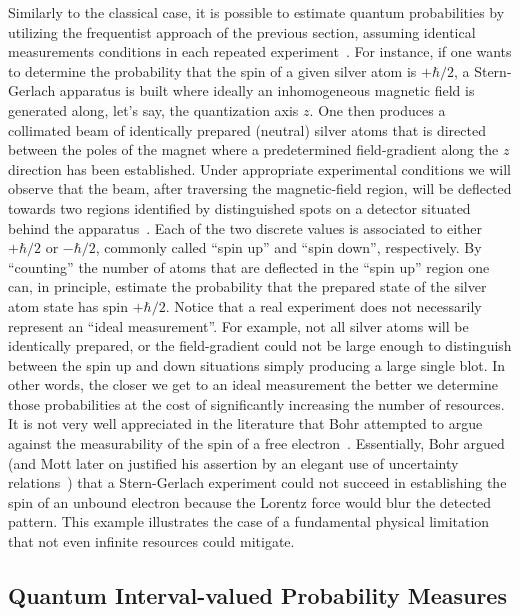 \documentclass{article}
\theoremstyle{remark}
\begin{document}
Similarly to the classical case, it is possible to estimate quantum
probabilities by utilizing the frequentist approach of the previous
section, assuming identical measurements conditions in each repeated
experiment~\cite{peres1995quantum}. For instance, if one wants to
determine the probability that the spin of a given silver atom is
$+\hbar/2$, a Stern-Gerlach apparatus is built where ideally an inhomogeneous
magnetic field is generated along, let's say, the quantization axis
$z$. One then produces a collimated beam of identically prepared
(neutral) silver atoms that is directed between the poles of the magnet
where a predetermined field-gradient along the $z$ direction has
been established. Under appropriate experimental conditions we will
observe that the beam, after traversing the magnetic-field region,
will be deflected towards two regions identified by distinguished
spots on a detector situated behind the apparatus~\cite{Stern1988,peres1995quantum,544199,Griffiths2003}.
Each of the two discrete values is associated to either $+\hbar/2$
or $-\hbar/2$, commonly called ``spin up'' and ``spin down'',
respectively. By ``counting'' the number of atoms that are deflected
in the ``spin up'' region one can, in principle, estimate the probability
that the prepared state of the silver atom state has spin $+\hbar/2$.
Notice that a real experiment does not necessarily represent an ``ideal
measurement''. For example, not all silver atoms will be identically
prepared, or the field-gradient could not be large enough to distinguish
between the spin up and down situations simply producing a large single
blot. In other words, the closer we get to an ideal measurement the
better we determine those probabilities at the cost of significantly
increasing the number of resources. It is not very well appreciated
in the literature that Bohr attempted to argue against the measurability
of the spin of a free electron~\cite{Bohr1985,MartensDeMuynck1994,McEvoy2001}.
Essentially, Bohr argued (and Mott later on justified his assertion
by an elegant use of uncertainty relations~\cite{10.2307/j.ctt7ztxn5.15})
that a Stern-Gerlach experiment could not succeed in establishing
the spin of an unbound electron because the Lorentz force would blur
the detected pattern. This example illustrates the case of a fundamental
physical limitation that not even infinite resources could mitigate.



\subsection{Quantum Interval-valued Probability Measures}
\end{document}

